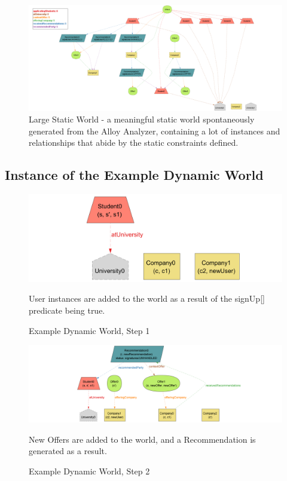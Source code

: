 \begin{figure}[H]
    \begin{center}
        \includegraphics[width=1\linewidth]{LaTeXCode/images/Alloy/largeStaticWorld_high_resolution.png}
        \caption{Large Static World - a meaningful static world spontaneously generated from the Alloy Analyzer, containing a lot of instances and relationships that abide by the static constraints defined.} 
        \label{fig: large_static_world}%
    \end{center}
\end{figure}

\subsection{Instance of the Example Dynamic World}

\begin{figure}[H]
    \begin{center}
        \includegraphics[width=0.5\linewidth]{LaTeXCode/images/Alloy/dynamicWorld_step1.png}
        \caption{Example Dynamic World, Step 1} 
        User instances are added to the world as a result of the signUp[] predicate being true.
        \label{fig: dynamicWorld_step1}%
    \end{center}
\end{figure}

\begin{figure}[H]
    \begin{center}
        \includegraphics[width=0.7\linewidth]{LaTeXCode/images/Alloy/dynamicWorld_step2.png}
        \caption{Example Dynamic World, Step 2}
        New Offers are added to the world, and a Recommendation is generated as a result.
        \label{fig: dynamicWorld_step2}%
    \end{center}
\end{figure}

